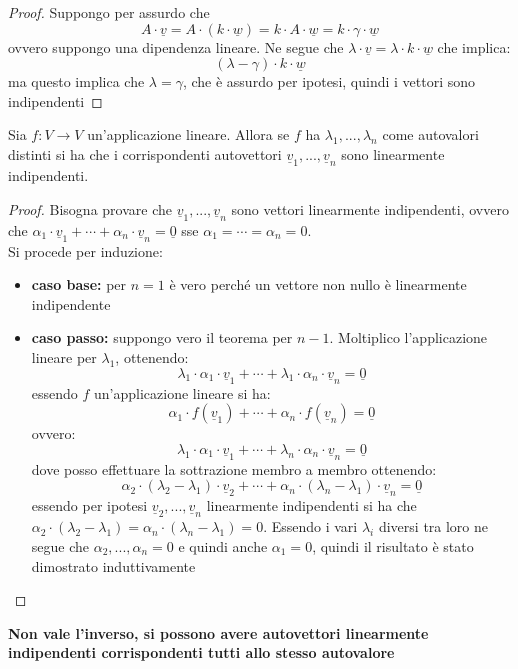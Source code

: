 \documentclass[a4paper,12pt, oneside]{book}
\begin{document}
\begin{proof}
	Suppongo per assurdo che $$A\cdot \underline{v}=A\cdot(k\cdot \underline{w})=k\cdot A\cdot\underline{w}=k\cdot \gamma\cdot \underline{w}$$
	ovvero suppongo una dipendenza lineare. Ne segue che $\lambda\cdot \underline{v}=\lambda\cdot k\cdot \underline{w}$ che implica:
	$$(\lambda-\gamma)\cdot k\cdot\underline{w}$$
	ma questo implica che $\lambda=\gamma$, che è assurdo per ipotesi, quindi i vettori sono indipendenti
\end{proof}
\begin{teorema}
	Sia $f:V\to V$ un'applicazione lineare. Allora se $f$ ha $\lambda_1,...,\lambda_n$ come autovalori distinti si ha che i corrispondenti autovettori $\underline{v}_1,...,\underline{v}_n$ sono linearmente indipendenti.
\end{teorema}
\begin{proof}
	Bisogna provare che $\underline{v}_1,...,\underline{v}_n$ sono vettori linearmente indipendenti, ovvero che $\alpha_1\cdot\underline{v}_1+\cdots+\alpha_n\cdot \underline{v}_n=\underline{0}$ sse $\alpha_1=\cdots=\alpha_n=0$.\\
	Si procede per induzione:
	\begin{itemize}
		\item \textbf{caso base:} per $n=1$ è vero perché un vettore non nullo è linearmente indipendente
		\item \textbf{caso passo:} suppongo vero il teorema per $n-1$. Moltiplico l'applicazione lineare per $\lambda_1$, ottenendo:
		      $$\lambda_1\cdot\alpha_1\cdot\underline{v}_1+\cdots+\lambda_1\cdot\alpha_n\cdot \underline{v}_n=\underline{0}$$
		      essendo $f$ un'applicazione lineare si ha:
		      $$\alpha_1\cdot f(\underline{v}_1)+\cdots+\alpha_n\cdot f(\underline{v}_n)=\underline{0}$$
		      ovvero:
		      $$\lambda_1\cdot\alpha_1\cdot\underline{v}_1+\cdots+\lambda_n\cdot\alpha_n\cdot \underline{v}_n=\underline{0}$$
		      dove posso effettuare la sottrazione membro a membro ottenendo:
		      $$\alpha_2\cdot (\lambda_2-\lambda_1)\cdot\underline{v}_2+\cdots+\alpha_n\cdot(\lambda_n-\lambda_1)\cdot \underline{v}_n=\underline{0}$$
		      essendo per ipotesi $\underline{v}_2,...,\underline{v}_n$ linearmente indipendenti si ha che $\alpha_2\cdot (\lambda_2-\lambda_1)=\alpha_n\cdot(\lambda_n-\lambda_1)=0$. Essendo i vari $\lambda_i$ diversi tra loro ne segue che $\alpha_2,...,\alpha_n=0$ e quindi anche $\alpha_1=0$, quindi il risultato è stato dimostrato induttivamente
	\end{itemize}
\end{proof}
\textbf{Non vale l'inverso, si possono avere autovettori linearmente indipendenti  corrispondenti tutti allo stesso autovalore}
\newpage
\end{document}
